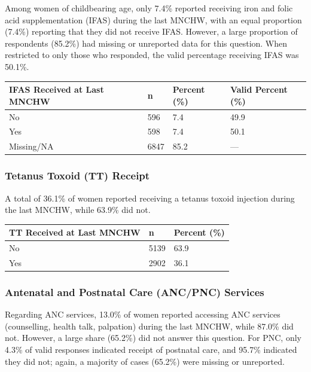 \documentclass[
  11pt,
]{report}
\begin{document}
Among women of childbearing age, only 7.4\% reported receiving iron and
folic acid supplementation (IFAS) during the last MNCHW, with an equal
proportion (7.4\%) reporting that they did not receive IFAS. However, a
large proportion of respondents (85.2\%) had missing or unreported data
for this question. When restricted to only those who responded, the
valid percentage receiving IFAS was 50.1\%.

\begin{longtable}[]{@{}llll@{}}
\toprule\noalign{}
IFAS Received at Last MNCHW & n & Percent (\%) & Valid Percent (\%) \\
\midrule\noalign{}
\endhead
\bottomrule\noalign{}
\endlastfoot
No & 596 & 7.4 & 49.9 \\
Yes & 598 & 7.4 & 50.1 \\
Missing/NA & 6847 & 85.2 & --- \\
\end{longtable}

\subsubsection{Tetanus Toxoid (TT)
Receipt}\label{tetanus-toxoid-tt-receipt}

A total of 36.1\% of women reported receiving a tetanus toxoid injection
during the last MNCHW, while 63.9\% did not.

\begin{longtable}[]{@{}lll@{}}
\toprule\noalign{}
TT Received at Last MNCHW & n & Percent (\%) \\
\midrule\noalign{}
\endhead
\bottomrule\noalign{}
\endlastfoot
No & 5139 & 63.9 \\
Yes & 2902 & 36.1 \\
\end{longtable}

\subsubsection{Antenatal and Postnatal Care (ANC/PNC)
Services}\label{antenatal-and-postnatal-care-ancpnc-services}

Regarding ANC services, 13.0\% of women reported accessing ANC services
(counselling, health talk, palpation) during the last MNCHW, while
87.0\% did not. However, a large share (65.2\%) did not answer this
question. For PNC, only 4.3\% of valid responses indicated receipt of
postnatal care, and 95.7\% indicated they did not; again, a majority of
cases (65.2\%) were missing or unreported.
\end{document}
